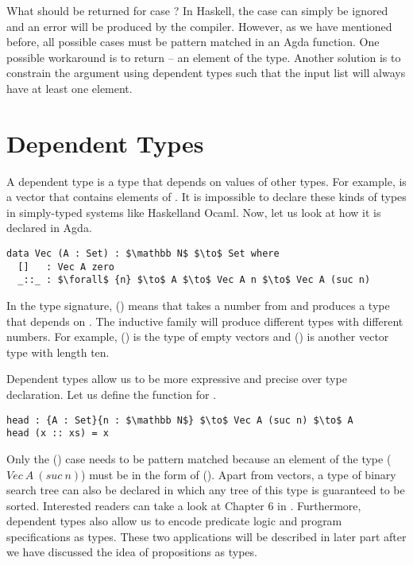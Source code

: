 \par What should be returned for case \mb{[\ ]}? In Haskell, the \mb{[\
  ]} case can simply be ignored and an error will be produced by the
compiler. However, as we have mentioned
before, all possible cases must be pattern matched in an Agda function. One
possible workaround is to return \mb{nothing} -- an element of the
\mb{Maybe} type. Another solution is
to constrain the argument using dependent types such that the input
list will always have at least one element. 


\section{Dependent Types}
\par A dependent type is a type that depends on values of other
types. For example,  is a vector that contains  elements
of \mb{A}. It is impossible to declare these kinds of types in
simply-typed systems like Haskell\footnotemark and Ocaml. Now, let
us look at how it is declared in Agda.
\begin{lstlisting}[mathescape=true,xleftmargin=.25\textwidth]
data Vec (A : Set) : $\mathbb N$ $\to$ Set where
  []   : Vec A zero
  _::_ : $\forall$ {n} $\to$ A $\to$ Vec A n $\to$ Vec A (suc n)
\end{lstlisting} 

\par In the type signature, () means
that  takes a number  from  and produces a
type that depends on \mb{n}. The inductive family \mb{Vec} will
produce different types with different numbers. For example, () is
the type of empty vectors and (\mb{Vec\ A\ 10}) is another vector type with length ten. 

\par Dependent types allow us to be more
expressive and precise over type declaration. Let us define the
 function for . 
\begin{lstlisting}[mathescape=true,xleftmargin=.25\textwidth]
head : {A : Set}{n : $\mathbb N$} $\to$ Vec A (suc n) $\to$ A
head (x :: xs) = x 
\end{lstlisting} 

\par Only the () case needs to be pattern matched because
an element of the type (\(Vec\ A\ (suc\ n)\)) must be in the form of
(\mb{x :: xs}). Apart from vectors, a type of binary
search tree can also be declared in which any tree of this type is guaranteed to be
sorted. Interested readers can take a look at 
Chapter 6 in \cite{bove2009}. Furthermore, dependent types also allow
us to encode predicate logic and program specifications as
types. These two applications will be described in later part after we
have discussed the idea of propositions as types. 


